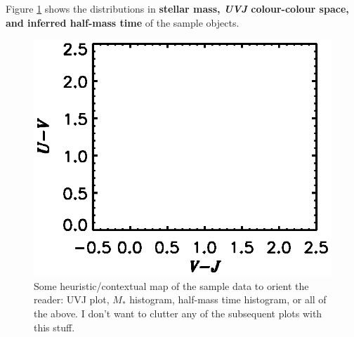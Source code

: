 \documentclass[a4paper,fleqn,usenatbib]{mnras}
\newcommand{\Mstel}{M_\ast}
\newcommand{\bfr}{\bf\color{red}}
\newcommand{\bfb}{\color{myblue}}
\begin{document}
Figure \ref{fig:sample} shows the distributions in {\bfr stellar mass, {\it UVJ} colour-colour space, 
and inferred half-mass time} of the sample objects.

\begin{figure}
	\centering
	\includegraphics[width = \columnwidth, trim=1cm 0.7cm 0cm 3cm]{context}
	\caption{\bfb Some heuristic/contextual map of the sample data to orient the reader: UVJ plot, 
			$\Mstel$ histogram, half-mass time histogram, or all of the above. I don't want to 
			clutter any of the subsequent plots with this stuff.}
	\label{fig:sample}
\end{figure}

\end{document}
